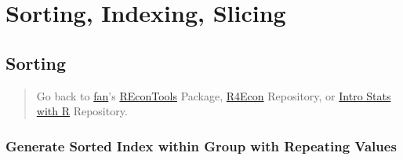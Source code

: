 \documentclass[
]{book}
\begin{document}
\begin{table}[!h]
\centering
{}
\end{table}

\hypertarget{sorting-indexing-slicing}{%
\section{Sorting, Indexing, Slicing}\label{sorting-indexing-slicing}}

\hypertarget{sorting}{%
\subsection{Sorting}\label{sorting}}

\begin{quote}
Go back to \href{http://fanwangecon.github.io/CodeDynaAsset/}{fan}'s \href{https://fanwangecon.github.io/REconTools/}{REconTools} Package, \href{https://fanwangecon.github.io/R4Econ/}{R4Econ} Repository, or \href{https://fanwangecon.github.io/Stat4Econ/}{Intro Stats with R} Repository.
\end{quote}

\hypertarget{generate-sorted-index-within-group-with-repeating-values}{%
\subsubsection{Generate Sorted Index within Group with Repeating Values}\label{generate-sorted-index-within-group-with-repeating-values}}
\end{document}
